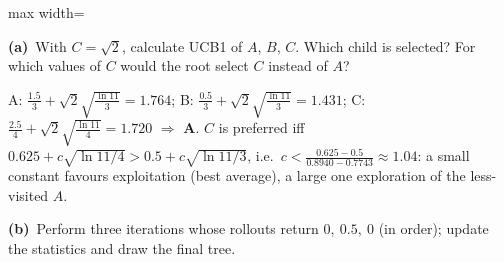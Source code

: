 \documentclass[11pt,a4paper]{article}
\newcommand{\subq}[1]{\par\smallskip\noindent\textbf{#1}\ }
\begin{document}
\begin{center}
\begin{adjustbox}{max width=\linewidth}
\end{adjustbox}
\end{center}
\subq{(a)}With $C=\sqrt2$, calculate UCB1 of $A$, $B$, $C$. Which child is selected? For which values of $C$ would the root select $C$ instead of $A$?
\begin{solbox}
A: $\frac{1.5}{3} + \sqrt2\sqrt{\frac{\ln 11}{3}} = 1.764$; B: $\frac{0.5}{3} + \sqrt2\sqrt{\frac{\ln 11}{3}} = 1.431$; C: $\frac{2.5}{4} + \sqrt2\sqrt{\frac{\ln 11}{4}} = 1.720$ $\Rightarrow$ \textbf{A}. $C$ is preferred iff $0.625+c\sqrt{\ln 11/4}>0.5+c\sqrt{\ln 11/3}$, i.e.\ $c<\frac{0.625-0.5}{0.8940-0.7743}\approx\mathbf{1.04}$: a small constant favours exploitation (best average), a large one exploration of the less-visited $A$.
\end{solbox}
\subq{(b)}Perform three iterations whose rollouts return $0,\ 0.5,\ 0$ (in order); update the statistics and draw the final tree.
\end{document}
